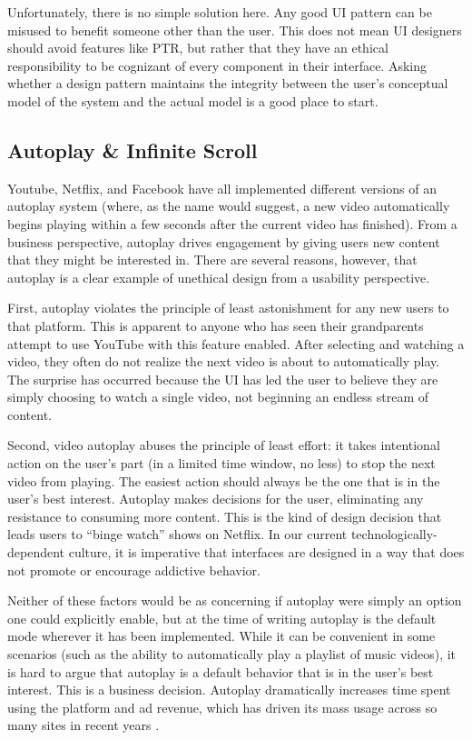 \documentclass[12pt, oneside]{article}
\begin{document}
Unfortunately, there is no simple solution here. Any good UI pattern can be misused to benefit someone other than the user. This does not mean UI designers should avoid features like PTR, but rather that they have an ethical responsibility to be cognizant of every component in their interface. Asking whether a design pattern maintains the integrity between the user's conceptual model of the system and the actual model is a good place to start.

\subsection{Autoplay \& Infinite Scroll}

Youtube, Netflix, and Facebook have all implemented different versions of an autoplay system (where, as the name would suggest, a new video automatically begins playing within a few seconds after the current video has finished). From a business perspective, autoplay drives engagement by giving users new content that they might be interested in. There are several reasons, however, that autoplay is a clear example of unethical design from a usability perspective.

First, autoplay violates the principle of least astonishment for any new users to that platform. This is apparent to anyone who has seen their grandparents attempt to use YouTube with this feature enabled. After selecting and watching a video, they often do not realize the next video is about to automatically play. The surprise has occurred because the UI has led the user to believe they are simply choosing to watch a single video, not beginning an endless stream of content.

Second, video autoplay abuses the principle of least effort: it takes intentional action on the user's part (in a limited time window, no less) to stop the next video from playing. The easiest action should always be the one that is in the user's best interest. Autoplay makes decisions for the user, eliminating any resistance to consuming more content. This is the kind of design decision that leads users to ``binge watch'' shows on Netflix. In our current technologically- dependent culture, it is imperative that interfaces are designed in a way that does not promote or encourage addictive behavior.

Neither of these factors would be as concerning if autoplay were simply an option one could explicitly enable, but at the time of writing autoplay is the default mode wherever it has been implemented. While it can be convenient in some scenarios (such as the ability to automatically play a playlist of music videos), it is hard to argue that autoplay is a default behavior that is in the user's best interest. This is a business decision. Autoplay dramatically increases time spent using the platform and ad revenue, which has driven its mass usage across so many sites in recent years \cite{moses_2017}.
\end{document}

